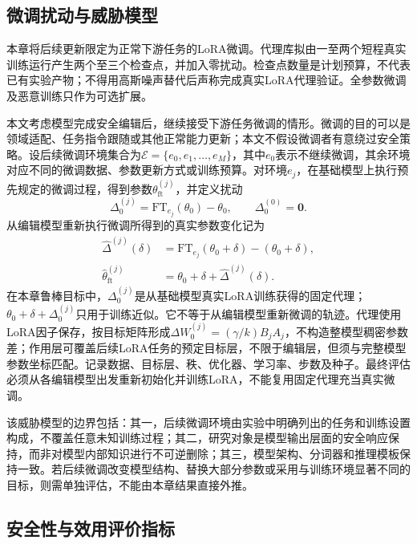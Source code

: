 \subsection{微调扰动与威胁模型}

本章将后续更新限定为正常下游任务的LoRA微调。代理库拟由一至两个短程真实训练运行产生两个至三个检查点，并加入零扰动。检查点数量是计划预算，不代表已有实验产物；不得用高斯噪声替代后声称完成真实LoRA代理验证。全参数微调及恶意训练只作为可选扩展。

本文考虑模型完成安全编辑后，继续接受下游任务微调的情形。微调的目的可以是领域适配、任务指令跟随或其他正常能力更新；本文不假设微调者有意绕过安全策略。设后续微调环境集合为$\mathcal{E}=\{e_0,e_1,\ldots,e_M\}$，其中$e_0$表示不继续微调，其余环境对应不同的微调数据、参数更新方式或训练预算。对环境$e_j$，在基础模型上执行预先规定的微调过程，得到参数$\theta_{\mathrm{ft}}^{(j)}$，并定义扰动
\begin{equation}
  \Delta_{0}^{(j)}
  =\mathrm{FT}_{e_j}(\theta_0)-\theta_0,\qquad
  \Delta_{0}^{(0)}=\mathbf{0}.
  \label{eq:ft-perturbation}
\end{equation}
从编辑模型重新执行微调所得到的真实参数变化记为
\begin{equation}
 \begin{aligned}
  \widehat\Delta^{(j)}(\delta)
  &={}\mathrm{FT}_{e_j}(\theta_0+\delta)-(\theta_0+\delta),\\
  \widehat\theta_{\mathrm{ft}}^{(j)}
  &={}\theta_0+\delta+\widehat\Delta^{(j)}(\delta).
 \end{aligned}
  \label{eq:actual-ft-perturbation}
\end{equation}
在本章鲁棒目标中，$\Delta_{0}^{(j)}$是从基础模型真实LoRA训练获得的固定代理；$\theta_0+\delta+\Delta_{0}^{(j)}$只用于训练近似。它不等于从编辑模型重新微调的轨迹。代理使用LoRA因子保存，按目标矩阵形成$\Delta W_{0}^{(j)}=(\gamma/k)B_jA_j$，不构造整模型稠密参数差；作用层可覆盖后续LoRA任务的预定目标层，不限于编辑层，但须与完整模型参数坐标匹配。记录数据、目标层、秩、优化器、学习率、步数及种子。最终评估必须从各编辑模型出发重新初始化并训练LoRA，不能复用固定代理充当真实微调。

该威胁模型的边界包括：其一，后续微调环境由实验中明确列出的任务和训练设置构成，不覆盖任意未知训练过程；其二，研究对象是模型输出层面的安全响应保持，而非对模型内部知识进行不可逆删除；其三，模型架构、分词器和推理模板保持一致。若后续微调改变模型结构、替换大部分参数或采用与训练环境显著不同的目标，则需单独评估，不能由本章结果直接外推。

\subsection{安全性与效用评价指标}

